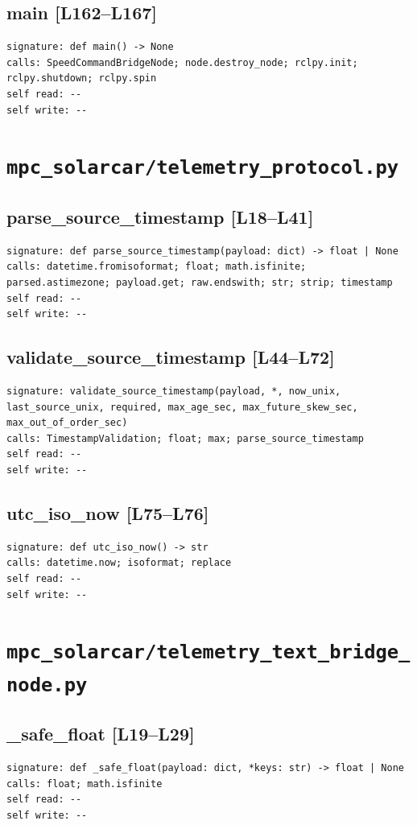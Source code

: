 \documentclass[a4paper,10pt,oneside]{book}
\begin{document}
\subsection*{main [L162--L167]}
\begin{lstlisting}[numbers=none]
signature: def main() -> None
calls: SpeedCommandBridgeNode; node.destroy_node; rclpy.init; rclpy.shutdown; rclpy.spin
self read: --
self write: --
\end{lstlisting}
\section{\texttt{mpc\_solarcar/telemetry\_protocol.py}}
\subsection*{parse\_source\_timestamp [L18--L41]}
\begin{lstlisting}[numbers=none]
signature: def parse_source_timestamp(payload: dict) -> float | None
calls: datetime.fromisoformat; float; math.isfinite; parsed.astimezone; payload.get; raw.endswith; str; strip; timestamp
self read: --
self write: --
\end{lstlisting}
\subsection*{validate\_source\_timestamp [L44--L72]}
\begin{lstlisting}[numbers=none]
signature: validate_source_timestamp(payload, *, now_unix, last_source_unix, required, max_age_sec, max_future_skew_sec, max_out_of_order_sec)
calls: TimestampValidation; float; max; parse_source_timestamp
self read: --
self write: --
\end{lstlisting}
\subsection*{utc\_iso\_now [L75--L76]}
\begin{lstlisting}[numbers=none]
signature: def utc_iso_now() -> str
calls: datetime.now; isoformat; replace
self read: --
self write: --
\end{lstlisting}
\section{\texttt{mpc\_solarcar/telemetry\_text\_bridge\_node.py}}
\subsection*{\_safe\_float [L19--L29]}
\begin{lstlisting}[numbers=none]
signature: def _safe_float(payload: dict, *keys: str) -> float | None
calls: float; math.isfinite
self read: --
self write: --
\end{lstlisting}
\end{document}
